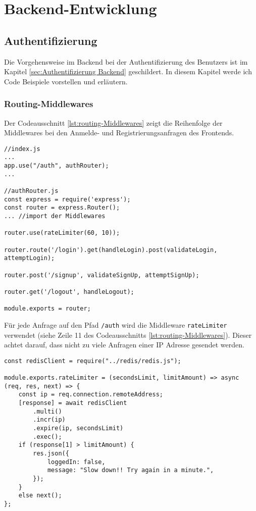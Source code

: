     \section{Backend-Entwicklung}
    \subsection{Authentifizierung}
    \label{sec:Backend-auth-impl}
Die Vorgehensweise im Backend bei der Authentifizierung des Benutzers ist im Kapitel \ref{sec:Authentifizierung Backend} geschildert. In diesem Kapitel werde ich Code Beispiele vorstellen und erläutern.

\subsubsection{Routing-Middlewares}
Der Codeausschnitt \ref{lst:routing-Middlewares} zeigt die Reihenfolge der Middlewares bei den Anmelde- und Registrierungsanfragen des Frontends.
\begin{lstlisting}[style=codeStyle, caption={Ausschnitt aus index.js und die Datei authRouter.js}, label={lst:routing-Middlewares}]
//index.js
...
app.use("/auth", authRouter);
...

//authRouter.js
const express = require('express');
const router = express.Router();
... //import der Middlewares

router.use(rateLimiter(60, 10));

router.route('/login').get(handleLogin).post(validateLogin, attemptLogin);

router.post('/signup', validateSignUp, attemptSignUp);

router.get('/logout', handleLogout);

module.exports = router;
\end{lstlisting}

Für jede Anfrage auf den Pfad \verb|/auth| wird die Middleware \verb|rateLimiter| verwendet (siehe Zeile 11 des Codeausschnitts \ref{lst:routing-Middlewares}). Dieser achtet darauf, dass nicht zu viele Anfragen einer IP Adresse gesendet werden. 

\begin{lstlisting}[style=codeStyle, caption={Die rateLimiter Middleware}, label={lst:rateLimiter}]
const redisClient = require("../redis/redis.js");

module.exports.rateLimiter = (secondsLimit, limitAmount) => async (req, res, next) => {
    const ip = req.connection.remoteAddress;
    [response] = await redisClient
        .multi()
        .incr(ip)
        .expire(ip, secondsLimit)
        .exec();
    if (response[1] > limitAmount) {
        res.json({
            loggedIn: false,
            message: "Slow down!! Try again in a minute.",
        });
    }
    else next();
};
\end{lstlisting}

